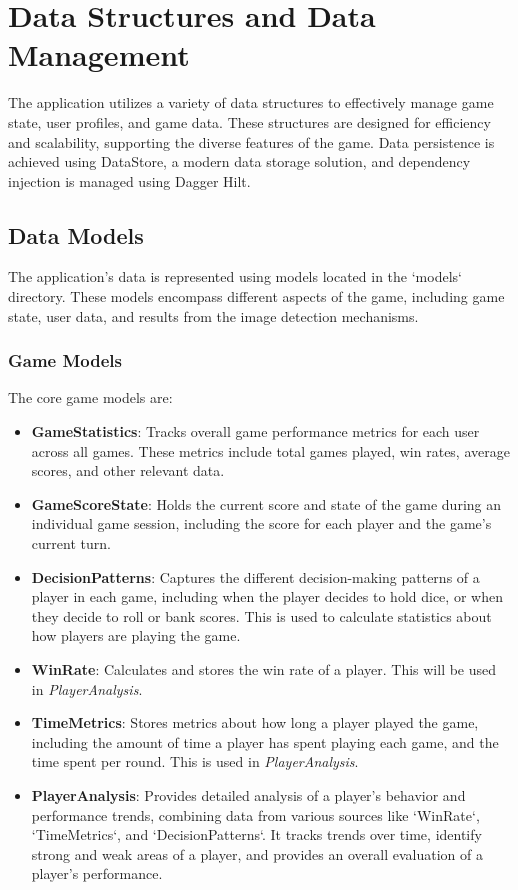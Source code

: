 \section{Data Structures and Data Management}

The application utilizes a variety of data structures to effectively manage game state, user profiles, and game data. These structures are designed for efficiency and scalability, supporting the diverse features of the game. Data persistence is achieved using DataStore, a modern data storage solution, and dependency injection is managed using Dagger Hilt.

\subsection{Data Models}

The application's data is represented using models located in the `models` directory. These models encompass different aspects of the game, including game state, user data, and results from the image detection mechanisms.

\subsubsection{Game Models}

The core game models are:
\begin{itemize}
    \item \textbf{GameStatistics}: Tracks overall game performance metrics for each user across all games. These metrics include total games played, win rates, average scores, and other relevant data.
    \item \textbf{GameScoreState}: Holds the current score and state of the game during an individual game session, including the score for each player and the game's current turn.
     \item \textbf{DecisionPatterns}: Captures the different decision-making patterns of a player in each game, including when the player decides to hold dice, or when they decide to roll or bank scores. This is used to calculate statistics about how players are playing the game.
    \item \textbf{WinRate}: Calculates and stores the win rate of a player. This will be used in \textit{PlayerAnalysis}.
    \item \textbf{TimeMetrics}: Stores metrics about how long a player played the game, including the amount of time a player has spent playing each game, and the time spent per round. This is used in \textit{PlayerAnalysis}.
    \item \textbf{PlayerAnalysis}: Provides detailed analysis of a player's behavior and performance trends, combining data from various sources like `WinRate`, `TimeMetrics`, and `DecisionPatterns`. It tracks trends over time, identify strong and weak areas of a player, and provides an overall evaluation of a player's performance.
\end{itemize}

